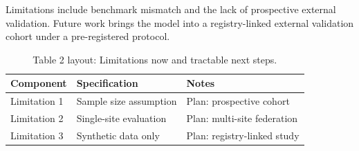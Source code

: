 
Limitations include benchmark mismatch and the lack of prospective external validation. Future work brings the model into a registry-linked external validation cohort under a pre-registered protocol.

\begin{table}[H]
\caption{Table 2 layout: Limitations now and tractable next steps.}
\label{tab:limits_future}
\centering
\begin{tabular}{>{\raggedright\arraybackslash}p{3.4cm} >{\raggedright\arraybackslash}p{4.6cm} >{\raggedright\arraybackslash}p{5.4cm}}
\toprule
\textbf{Component} & \textbf{Specification} & \textbf{Notes} \\
\midrule
  Limitation 1 & Sample size assumption & Plan: prospective cohort \\
  Limitation 2 & Single-site evaluation & Plan: multi-site federation \\
  Limitation 3 & Synthetic data only & Plan: registry-linked study \\
\bottomrule
\end{tabular}
\end{table}
